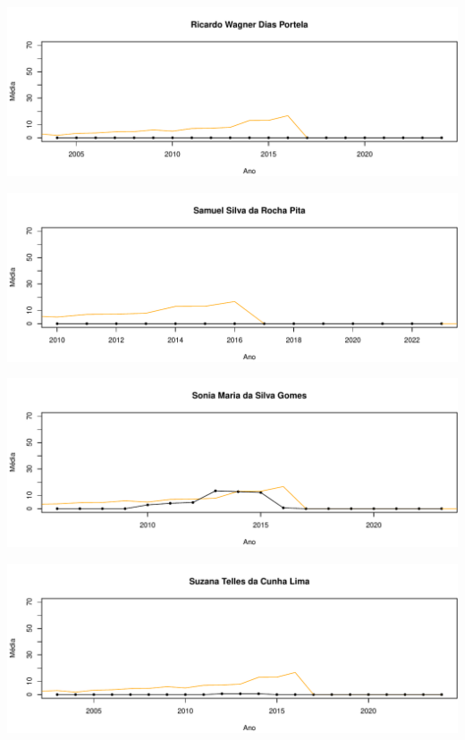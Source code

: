 \documentclass[12pt,brazil]{article}\usepackage[]{graphicx}\usepackage[]{xcolor}
\makeatletter
\def\maxwidth{ %
  \ifdim\Gin@nat@width>\linewidth
    \linewidth
  \else
    \Gin@nat@width
  \fi
}
\makeatother
\begin{document}
\vspace{0.5cm}


{\centering \includegraphics[width=\maxwidth]{figure/mediamovel-55} 

}



\vspace{0.5cm}


{\centering \includegraphics[width=\maxwidth]{figure/mediamovel-56} 

}



\vspace{0.5cm}


{\centering \includegraphics[width=\maxwidth]{figure/mediamovel-57} 

}



\vspace{0.5cm}


{\centering \includegraphics[width=\maxwidth]{figure/mediamovel-58} 

}
\end{document}
